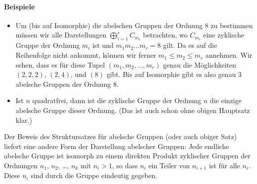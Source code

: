 \documentclass[12pt,a4paper,twoside]{article}
\begin{document}
\paragraph{Beispiele}
\begin{itemize}
\item Um (bis auf Isomorphie) die abelschen Gruppen der Ordnung $8$ zu
  bestimmen m\"ussen wir alle Darstellungen $\bigoplus_{i=1}^rC_{m_i}$
  betrachten, wo $C_{m_i}$ eine zyklische Gruppe der Ordnung $m_i$ ist und
  $m_1m_2\dots m_r=8$ gilt. Da es auf die Reihenfolge nicht ankommt, k\"onnen
  wir ferner $m_1\le m_2\le m_r$ annehmen. Wir sehen, dass es f\"ur diese
  Tupel $(m_1,m_2,\dots,m_r)$ genau die M\"oglichkeiten $(2,2,2)$, $(2,4)$,
  und $(8)$ gibt. Bis auf Isomorphie gibt es also genau $3$ abelsche Gruppen
  der Ordnung $8$.
\item Ist $n$ quadratfrei, dann ist die zyklische Gruppe der Ordnung $n$ die
  einzige abelsche Gruppe dieser Ordnung. (Das ist auch schon ohne obigen
  Hauptsatz klar.)
\end{itemize}
\begin{Bemerkung*}
  Der Beweis des Struktursatzes f\"ur abelsche Gruppen (oder auch obiger Satz)
  liefert eine andere Form der Darstellung abelscher Gruppen: Jede endliche
  abelsche Gruppe ist isomorph zu einem direkten Produkt zyklischer Gruppen
  der Ordnungen $n_1$, $n_2$, \dots, $n_k$ mit $n_i>1$, so dass $n_i$ ein
  Teiler von $n_{i+1}$ ist f\"ur alle $n_i$. Diese $n_i$ sind durch die Gruppe
  eindeutig gegeben.
\end{Bemerkung*}
\end{document}
